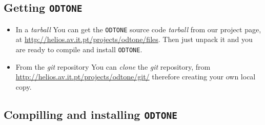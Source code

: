 \documentclass[11pt]{article}
\begin{document}
\subsection{Getting \texttt{ODTONE}}
\label{sec-1.2}


\begin{itemize}
\item	In a \textit{tarball}
	\subitem	You can get the \texttt{ODTONE} source code \textit{tarball}
from our project page, at \url{http://helios.av.it.pt/projects/odtone/files}. Then
just unpack it and you are ready to compile and install \texttt{ODTONE}.

\item	From the \textit{git} repository
You can \textit{clone} the \textit{git} repository, from \href{http://helios.av.it.pt/projects/odtone/git/}{http://helios.av.it.pt/projects/odtone/git/}
therefore creating your own local copy.



\end{itemize}





%
%


\subsection{Compilling and installing \texttt{ODTONE}}
\label{sec-1.3}
\end{document}
